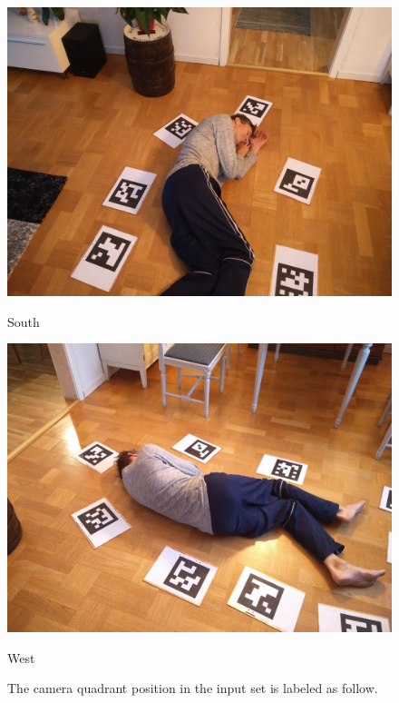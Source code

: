 \begin{figure}
\begin{center}
\begin{minipage}[t]{0.2\textwidth}
        \includegraphics[width=\textwidth]{images/datasets/P2/images/093551.jpg}
        \caption*{South}
    \end{minipage}
    \begin{minipage}[t]{0.2\textwidth}
        \includegraphics[width=\textwidth]{images/datasets/P2/images/093335.jpg}
        \caption*{West}
    \end{minipage}
\end{center}
\caption[Camera quadrant position]{The camera quadrant position in the input set is labeled as follow.}
\label{fig:camera_pos_lables}
\end{figure}

